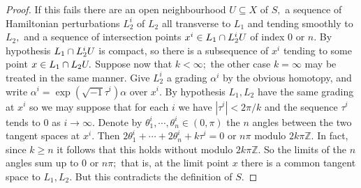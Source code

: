 \documentclass[10pt,a4paper]{amsart}
\def\Z{{\mathbin{\mathbb Z}}}
\def\al{\alpha}
\def\ge{\geqslant}
\def\iy{\infty}
\def\sb{\subseteq}
\def\ta{\tau}
\def\th{\theta}
\begin{document}
\begin{proof}
If this fails there are an open neighbourhood $U\sb X$ of $S,$
a sequence of Hamiltonian perturbations $L_2^i$ of $L_2$ all transverse to $L_1$ and tending smoothly to $L_2,$
and a sequence of intersection points $x^i\in L_1\cap L_2^i\-U$ of index $0$ or $n.$
By hypothesis $L_1\cap L_2^i\-U$ is compact, so there is a subsequence of $x^i$ tending to some point $x\in L_1\cap L_2\-U.$
Suppose now that $k<\iy;$
the other case $k=\iy$ may be treated in the same manner.
Give $L_2^i$ a grading $\al^i$ by the obvious homotopy,
and write $\al^i=\exp(\sqrt{-1}\ta^i)\al$ over $x^i.$
By hypothesis $L_1,L_2$ have the same grading at $x^i$ so we may suppose that for each $i$ we have $|\ta^i|<2\pi/k$ and the sequence $\ta^i$ tends to $0$ as $i\to\iy.$
Denote by $\th_1^i,\cdots,\th_n^i\in(0,\pi)$ the $n$ angles between the two tangent spaces at $x^i.$
Then
$2\th_1^i+\cdots+2\th_n^i+k\ta^i=0\text{ or }n\pi\text{ modulo }2k\pi\Z.$
In fact, since $k\ge n$ it follows that this holds without modulo $2k\pi\Z.$
So the limits of the $n$ angles sum up to $0$ or $n\pi;$
that is, at the limit point $x$ there is a common tangent space to $L_1,L_2.$
But this contradicts the definition of $S.$
\end{proof}
\end{document}
